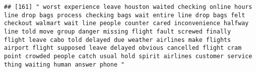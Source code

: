 \documentclass[
]{article}
\begin{document}
\begin{verbatim}
## [161] " worst experience leave houston waited checking online hours line drop bags process checking bags wait entire line drop bags felt checkout walmart wait line people counter cared inconvenience halfway line told move group danger missing flight fault screwed finally flight leave cabo told delayed due weather airlines make flights airport flight supposed leave delayed obvious cancelled flight cram point crowded people catch usual hold spirit airlines customer service thing waiting human answer phone "                                                                                                                                                                                                                                                                                                                                                                                                                                                                                                                                                                                                                                                                                                                                                                                                                                                                                                                                                                                                                                                                                                                                                                                                                                                                        

\end{verbatim}
\end{document}
